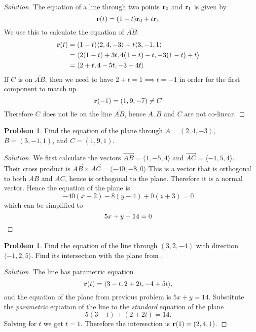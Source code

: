 \documentclass[12pt]{amsart}%
\theoremstyle{plain}
\theoremstyle{definition}
\newtheorem{prob}[theorem]{Problem}
\theoremstyle{special}
\newcommand{\sol}[1]{
{\begin{proof}[Solution]#1\end{proof}}
}
\newcommand{\Prob}[1]{\begin{tcolorbox}%
\begin{prob}
	#1
\end{prob}
\end{tcolorbox}	
}
\begin{document}
\sol{The equation of a line through two points ${\bf r}_0$ and ${\bf r}_1$ is given by
\[{\bf r}(t)=(1-t){\bf r}_0+t{\bf r}_1\]
We use this to calculate the equation of $\overline{AB}$:
\begin{align*}{\bf r}(t)&=(1-t)\langle2,4,-3\rangle+t\langle 3,-1,1\rangle\\
&=\langle2(1-t)+3t,4(1-t)-t,-3(1-t)+t \rangle\\
&=\langle 2+t,4-5t,-3+4t \rangle\end{align*}
If $C$ is on $\overline{AB}$, then we need to have $2+t=1\implies t=-1$ in order for the first component to match up.
\[{\bf r}(-1)=(1,9,-7)\neq C\]
Therefore $C$ does not lie on the line $\overline{AB}$, hence $A,B$ and $C$ are not co-linear.
}
\Prob{\label{q2.4}Find the equation of the plane through $A=(2,4,-3)$, $B=(3,-1,1)$, and $C=(1,9,1)$.}
\sol{We first calculate the vectors
\(\overrightarrow{AB}=\langle 1,-5,4\rangle\) and \(\overrightarrow{AC}=\langle-1,5,4\rangle\).
Their cross product is
\(\overrightarrow{AB}\times\overrightarrow{AC}=\langle-40,-8,0 \rangle \)
This is a vector that is orthogonal to both $AB$ and $AC$, hence is orthogonal to the plane. Therefore it is a normal vector.
Hence the equation of the plane is
\[-40(x-2)-8(y-4)+0(z+3)=0\]
which can be simplified to
\[5x+y-14=0\qedhere\]
}
\Prob{Find the equation of the line through $(3,2,-4)$ with direction $\langle -1,2,5\rangle$. Find its intersection with the plane from \Cref{q2.4}.}
\sol{
The line has parametric equation
\[{\bf r}(t)=\langle 3-t,2+2t,-4+5t\rangle,\]
and the equation of the plane from previous problem is $5x+y=14$. Substitute the \emph{parametric} equation of the line to the \emph{standard} equation of the plane
\[5(3-t)+(2+2t)=14.\]
Solving for $t$ we get $t=1$. Therefore the intersection is ${\bf r}(1)=(2,4,1)$.\qedhere
}\bigskip
\end{document}
